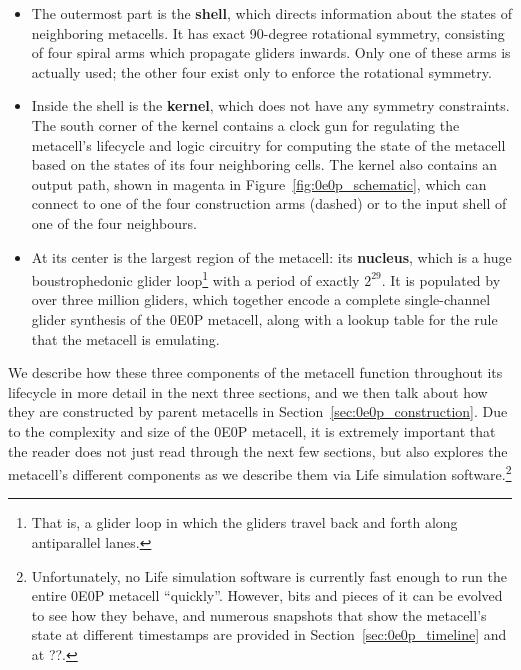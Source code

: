 \begin{itemize}
	\item The outermost part is the \textbf{shell}, which directs information about the states of neighboring metacells. It has exact 90-degree rotational symmetry, consisting of four spiral arms which propagate gliders inwards. Only one of these arms is actually used; the other four exist only to enforce the rotational symmetry.\smallskip
	
	\item Inside the shell is the \textbf{kernel}, which does not have any symmetry constraints. The south corner of the kernel contains a clock gun for regulating the metacell's lifecycle and logic circuitry for computing the state of the metacell based on the states of its four neighboring cells. The kernel also contains an output path, shown in magenta in Figure~\ref{fig:0e0p_schematic}, which can connect to one of the four construction arms (dashed) or to the input shell of one of the four neighbours.\smallskip
	
	\item At its center is the largest region of the metacell: its \textbf{nucleus}, which is a huge boustrophedonic glider loop\footnote{That is, a glider loop in which the gliders travel back and forth along antiparallel lanes.} with a period of exactly $2^{29}$. It is populated by over three million gliders, which together encode a complete single-channel glider synthesis of the 0E0P metacell, along with a lookup table for the rule that the metacell is emulating.\smallskip
\end{itemize}

We describe how these three components of the metacell function throughout its lifecycle in more detail in the next three sections, and we then talk about how they are constructed by parent metacells in Section~\ref{sec:0e0p_construction}. Due to the complexity and size of the 0E0P metacell, it is extremely important that the reader does not just read through the next few sections, but also explores the metacell's different components as we describe them via Life simulation software.\footnote{Unfortunately, no Life simulation software is currently fast enough to run the entire 0E0P metacell ``quickly''. However, bits and pieces of it can be evolved to see how they behave, and numerous snapshots that show the metacell's state at different timestamps are provided in Section~\ref{sec:0e0p_timeline} and at ??.}%


